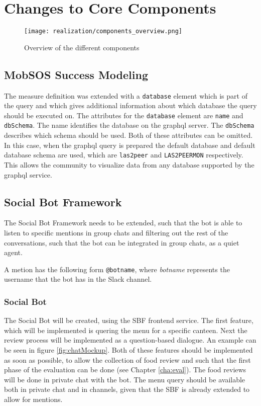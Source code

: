 \section{Changes to Core Components} \label{sec:changes}
\begin{figure}[h]
    \centering
    \texttt{[image: realization/components\_overview.png]}
    \caption{Overview of the different components}
    \label{fig:componentsOverview}
\end{figure}
\subsection{MobSOS Success Modeling}
The measure definition was extended with a \texttt{database} element which is part of the query and which gives additional information about which database the query should be executed on. The attributes for the \texttt{database} element are \texttt{name} and \texttt{dbSchema}. The name identifies the database on the graphql server. The \texttt{dbSchema} describes which schema should be used.
Both of these attributes can be omitted. In this case, when the graphql query is prepared the default database and default database schema are used, which are \texttt{las2peer} and \texttt{LAS2PEERMON} respectively.
This allows the community to visualize data from any database supported by the graphql service.

\subsection{Social Bot Framework}
The Social Bot Framework needs to be extended, such that the bot is able to listen to specific mentions in group chats and filtering out the rest of the conversations, such that the bot can be integrated in group chats, as a quiet agent.

A metion has the following form \texttt{@botname}, where \emph{botname} represents the username that the bot has in the Slack channel.

\subsubsection{Social Bot}
The Social Bot will be created, using the SBF frontend service.
The first feature, which will be implemented is quering the menu for a specific canteen. Next the review process will be implemented as a question-based dialogue. An example can be seen in figure \ref{fig:chatMockup}.
Both of these features should be implemented as soon as possible, to allow the collection of food review and such that the first phase of the evaluation can be done (see Chapter \ref{cha:eval}).
The food reviews will be done in private chat with the bot. The menu query should be available both in private chat and in channels, given that the SBF is already extended to allow for mentions.

